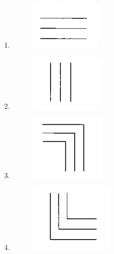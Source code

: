 \documentclass[a4paper,10pt]{article}
\begin{document}
\begin{enumerate}
\begin{multicols}{2}
\begin{enumerate}
\item \begin{figure}[H]
    \centering
    \includegraphics[width=0.5\columnwidth]{B10opt1.png}
    \caption*{}
    \label{fig:opt1}
\end{figure}
\item \begin{figure}[H]
    \centering
    \includegraphics[width=0.5\columnwidth]{B10opt2.png}
    \caption*{}
    \label{fig:opt2}
\end{figure}
\item \begin{figure}[H]
    \centering
    \includegraphics[width=0.5\columnwidth]{B10opt3.png}
    \caption*{}
    \label{fig:opt3}
\end{figure}
\item \begin{figure}[H]
    \centering
    \includegraphics[width=0.5\columnwidth]{B10opt4.png}

\end{figure}
\end{enumerate}
\end{multicols}
\end{enumerate}
\end{document}
